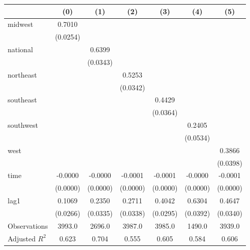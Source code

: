 \begin{tabular}{lcccccc}
\toprule
 & (0) & (1) & (2) & (3) & (4) & (5) \\
\midrule
midwest & 0.7010 &  &  &  &  &  \\
\vspace{0.2cm}
 & (0.0254) &  &  &  &  &  \\
national &  & 0.6399 &  &  &  &  \\
\vspace{0.2cm}
 &  & (0.0343) &  &  &  &  \\
northeast &  &  & 0.5253 &  &  &  \\
\vspace{0.2cm}
 &  &  & (0.0342) &  &  &  \\
southeast &  &  &  & 0.4429 &  &  \\
\vspace{0.2cm}
 &  &  &  & (0.0364) &  &  \\
southwest &  &  &  &  & 0.2405 &  \\
\vspace{0.2cm}
 &  &  &  &  & (0.0534) &  \\
west &  &  &  &  &  & 0.3866 \\
\vspace{0.2cm}
 &  &  &  &  &  & (0.0398) \\
time & -0.0000 & -0.0000 & -0.0001 & -0.0001 & -0.0000 & -0.0001 \\
\vspace{0.2cm}
 & (0.0000) & (0.0000) & (0.0000) & (0.0000) & (0.0000) & (0.0000) \\
lag1 & 0.1069 & 0.2350 & 0.2711 & 0.4042 & 0.6304 & 0.4647 \\
\vspace{0.2cm}
 & (0.0266) & (0.0335) & (0.0338) & (0.0295) & (0.0392) & (0.0340) \\
\midrule
Observations & 3993.0 & 2696.0 & 3987.0 & 3985.0 & 1490.0 & 3939.0 \\
Adjusted $R^2$ & 0.623 & 0.704 & 0.555 & 0.605 & 0.584 & 0.606 \\
\bottomrule
\end{tabular}